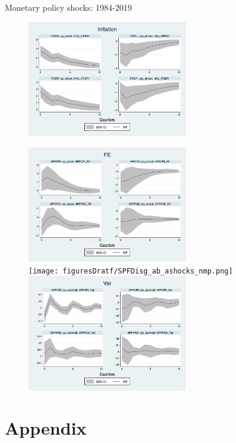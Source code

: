 \documentclass{beamer}
\begin{document}
\begin{frame}{Monetary policy shocks: 1984-2019}

\begin{figure}
	\includegraphics[width=7cm]{figuresDraft/Inf_ashocks_nmp.png}  
	
	\includegraphics[width=7cm]{figuresDraft/SPFFE_ashocks_nmp.png}  \\
	\smallskip 
	\texttt{[image: figuresDratf/SPFDisg\_ab\_ashocks\_nmp.png]} 
	\smallskip 
	\includegraphics[width=7cm]{figuresDraft/SPFVar_ab_ashocks_nmp.png}  
\end{figure}

\end{frame}






\section{Appendix}
\end{document}
